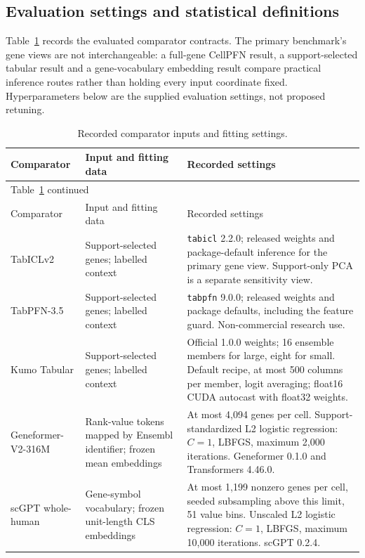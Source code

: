 \subsection*{Evaluation settings and statistical definitions}

Table~\ref{tab:evaluation-settings} records the evaluated comparator contracts. The primary benchmark's gene views are not interchangeable: a full-gene CellPFN result, a support-selected tabular result and a gene-vocabulary embedding result compare practical inference routes rather than holding every input coordinate fixed. Hyperparameters below are the supplied evaluation settings, not proposed retuning.

\begingroup
\small
\setlength{\tabcolsep}{4pt}
\renewcommand{\arraystretch}{1.15}
\begin{longtable}{p{}p{}p{}}
\caption{Recorded comparator inputs and fitting settings.}\label{tab:evaluation-settings}\\
\toprule
Comparator & Input and fitting data & Recorded settings \\
\midrule
\endfirsthead
\multicolumn{3}{l}{Table~\ref{tab:evaluation-settings} continued}\\
\toprule
Comparator & Input and fitting data & Recorded settings \\
\midrule
\endhead
\bottomrule
\endfoot
TabICLv2 & Support-selected genes; labelled context & \texttt{tabicl} 2.2.0; released weights and package-default inference for the primary gene view. Support-only PCA is a separate sensitivity view. \\
TabPFN-3.5 & Support-selected genes; labelled context & \texttt{tabpfn} 9.0.0; released weights and package defaults, including the feature guard. Non-commercial research use. \\
Kumo Tabular & Support-selected genes; labelled context & Official 1.0.0 weights; 16 ensemble members for large, eight for small. Default recipe, at most 500 columns per member, logit averaging; float16 CUDA autocast with float32 weights. \\
Geneformer-V2-316M & Rank-value tokens mapped by Ensembl identifier; frozen mean embeddings & At most 4,094 genes per cell. Support-standardized L2 logistic regression: $C=1$, LBFGS, maximum 2,000 iterations. Geneformer 0.1.0 and Transformers 4.46.0. \\
scGPT whole-human & Gene-symbol vocabulary; frozen unit-length CLS embeddings & At most 1,199 nonzero genes per cell, seeded subsampling above this limit, 51 value bins. Unscaled L2 logistic regression: $C=1$, LBFGS, maximum 10,000 iterations. scGPT 0.2.4. \\

\end{longtable}
